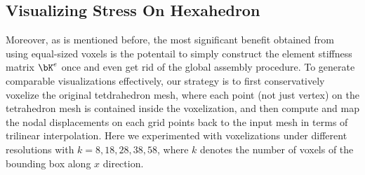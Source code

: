 \subsection{Visualizing Stress On Hexahedron}
Moreover, as is mentioned before, the most significant benefit obtained from using equal-sized voxels is the potentail to simply construct
the element stiffness matrix $\bK^e$ once and even get rid of the global assembly procedure. To generate comparable visualizations effectively, our strategy is to first conservatively voxelize
the original tetdrahedron mesh, where each point (not just vertex) on the tetrahedron mesh is contained inside the voxelization, and then compute and map the nodal displacements on each grid points back to the input mesh in terms of trilinear interpolation.
Here we experimented with voxelizations under different resolutions with $k = 8, 18, 28, 38, 58$, where $k$ denotes the number of voxels of the bounding box along $x$ direction.

